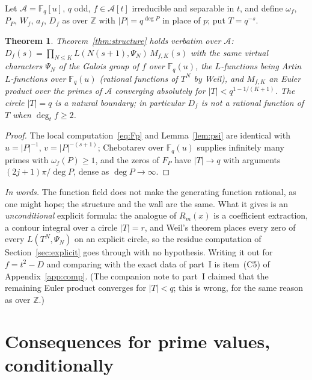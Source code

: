 \documentclass[11pt,a4paper]{article}
\newtheorem{theorem}{Theorem}
\theoremstyle{remark}\newtheorem{remark}[theorem]{Remark}
\newcommand{\Z}{\mathbb{Z}}\newcommand{\Q}{\mathbb{Q}}\newcommand{\F}{\mathbb{F}}\newcommand{\C}{\mathbb{C}}
\begin{document}
Let $\mathcal A=\F_q[u]$, $q$ odd, $f\in\mathcal A[t]$ irreducible and separable in $t$, and define $\omega_f$,
$P_P$, $W_f$, $a_f$, $D_f$ as over $\Z$ with $|P|=q^{\deg P}$ in place of $p$; put $T=q^{-s}$.

\begin{theorem}\label{thm:ffstructure}
Theorem~\ref{thm:structure} holds verbatim over $\mathcal A$: $D_f(s)=\prod_{N\le K}L(N(s+1),\Psi_N)\,M_{f,K}(s)$
with the same virtual characters $\Psi_N$ of the Galois group of $f$ over $\F_q(u)$, the $L$-functions being
Artin $L$-functions over $\F_q(u)$ (rational functions of $T^N$ by Weil), and $M_{f,K}$ an Euler product over
the primes of $\mathcal A$ converging absolutely for $|T|<q^{1-1/(K+1)}$. The circle $|T|=q$ is a natural
boundary; in particular $D_f$ is not a rational function of $T$ when $\deg_tf\ge2$.
\end{theorem}
\begin{proof}
The local computation~\eqref{eq:Fp} and Lemma~\ref{lem:psi} are identical with $u=|P|^{-1}$, $v=|P|^{-(s+1)}$;
Chebotarev over $\F_q(u)$ supplies infinitely many primes with $\omega_f(P)\ge1$, and the zeros of $F_P$ have
$|T|\to q$ with arguments $(2j+1)\pi/\deg P$, dense as $\deg P\to\infty$.
\end{proof}

\emph{In words.} The function field does not make the generating function rational, as one might hope; the
structure and the wall are the same. What it gives is an \emph{unconditional} explicit formula: the analogue
of $R_m(x)$ is a coefficient extraction, a contour integral over a circle $|T|=r$, and Weil's theorem places
every zero of every $L(T^N,\Psi_N)$ on an explicit circle, so the residue computation of
Section~\ref{sec:explicit} goes through with no hypothesis. Writing it out for $f=t^2-D$ and comparing with
the exact data of part~I is item~(C5) of Appendix~\ref{app:comp}. (The companion note to part~I claimed that
the remaining Euler product converges for $|T|<q$; this is wrong, for the same reason as over $\Z$.)

\section{Consequences for prime values, conditionally}\label{sec:primes}
\end{document}
